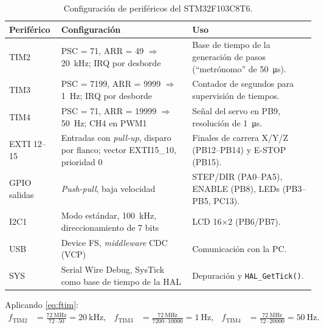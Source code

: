 \begin{table}[H]
\centering\small
\caption{Configuración de periféricos del STM32F103C8T6.}\label{tab:perifericos}
\begin{tabularx}{\textwidth}{@{}l >{\raggedright\arraybackslash}p{6.2cm} >{\raggedright\arraybackslash}X@{}}
\toprule
\textbf{Periférico} & \textbf{Configuración} & \textbf{Uso}\\
\midrule
TIM2 & PSC = 71, ARR = 49 $\Rightarrow$ \SI{20}{\kilo\hertz}; IRQ por desborde & Base de tiempo de la generación de pasos (``metrónomo'' de \SI{50}{\micro\second}).\\
TIM3 & PSC = 7199, ARR = 9999 $\Rightarrow$ \SI{1}{\hertz}; IRQ por desborde & Contador de segundos para supervisión de tiempos.\\
TIM4 & PSC = 71, ARR = 19999 $\Rightarrow$ \SI{50}{\hertz}; CH4 en PWM1 & Señal del servo en PB9, resolución de \SI{1}{\micro\second}.\\
EXTI 12--15 & Entradas con \emph{pull-up}, disparo por flanco; vector EXTI15\_10, prioridad 0 & Finales de carrera X/Y/Z (PB12--PB14) y E-STOP (PB15).\\
GPIO salidas & \emph{Push-pull}, baja velocidad & STEP/DIR (PA0--PA5), ENABLE (PB8), LEDs (PB3--PB5, PC13).\\
I2C1 & Modo estándar, \SI{100}{\kilo\hertz}, direccionamiento de 7 bits & LCD 16$\times$2 (PB6/PB7).\\
USB & Device FS, \emph{middleware} CDC (VCP) & Comunicación con la PC.\\
SYS & Serial Wire Debug, SysTick como base de tiempo de la HAL & Depuración y \texttt{HAL\_GetTick()}.\\
\bottomrule
\end{tabularx}
\end{table}

Aplicando \eqref{eq:ftim}:
\begin{align}
  f_{\mathrm{TIM2}} &= \frac{\SI{72}{\mega\hertz}}{72\cdot 50} = \SI{20}{\kilo\hertz}, &
  f_{\mathrm{TIM3}} &= \frac{\SI{72}{\mega\hertz}}{7200\cdot 10000} = \SI{1}{\hertz}, &
  f_{\mathrm{TIM4}} &= \frac{\SI{72}{\mega\hertz}}{72\cdot 20000} = \SI{50}{\hertz}.
\end{align}



